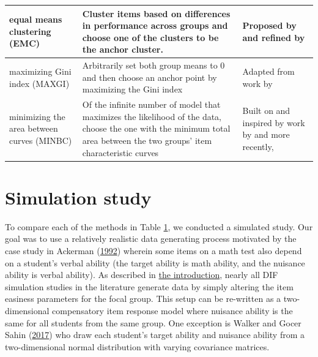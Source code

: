 \documentclass[
  11pt,
]{article}
\begin{document}
\begin{table}[H]
\begin{tabular}{|p{4cm}|p{6cm}|p{4cm}|}
equal means clustering (EMC) & Cluster items based on differences in performance across groups and choose one of the clusters to be the anchor cluster. & Proposed by \cite{bechger2015statistical} and refined by \cite{pohl2017cluster} \\\hline

maximizing Gini index (MAXGI) & Arbitrarily set both group means to 0 and then choose an anchor point by maximizing the Gini index & Adapted from work by \cite{strobl2018anchor} \\\hline

minimizing the area between curves (MINBC) & Of the infinite number of model that maximizes the likelihood of the data, choose the one with the minimum total area between the two groups' item characteristic curves & Built on and inspired by work by \cite{raju1988area} and more recently, \cite{chalmers2016might} \\

\bottomrule
\end{tabular}
\label{table:allmethods}
\end{table}

\hypertarget{simstudy}{%
\section{Simulation study}\label{simstudy}}

To compare each of the methods in Table \ref{table:allmethods}, we conducted a simulated study. Our goal was to use a relatively realistic data generating process motivated by the case study in Ackerman (\protect\hyperlink{ref-ackerman1992didactic}{1992}) wherein some items on a math test also depend on a student's verbal ability (the target ability is math ability, and the nuisance ability is verbal ability). As described in \protect\hyperlink{intro}{the introduction}, nearly all DIF simulation studies in the literature generate data by simply altering the item easiness parameters for the focal group. This setup can be re-written as a two-dimensional compensatory item response model where nuisance ability is the same for all students from the same group. One exception is Walker and Gocer Sahin (\protect\hyperlink{ref-walker2017using}{2017}) who draw each student's target ability and nuisance ability from a two-dimensional normal distribution with varying covariance matrices.
\end{document}
